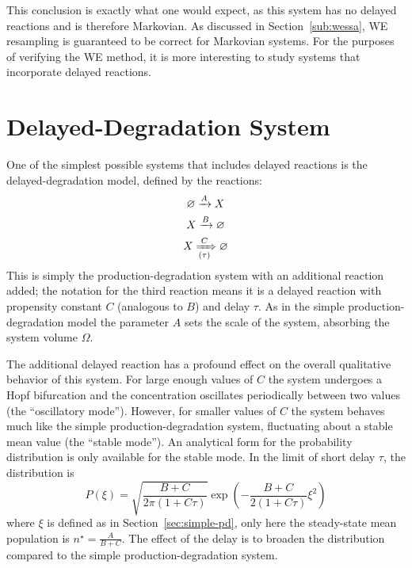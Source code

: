 \documentclass[english,letterpaper,12pt]{report}
\begin{document}
\begin{doublespacing}
This conclusion is exactly what one would expect, as this system has no delayed reactions and is therefore Markovian. As discussed in Section~\ref{sub:wessa}, WE resampling is guaranteed to be correct for Markovian systems. For the purposes of verifying the WE method, it is more interesting to study systems that incorporate delayed reactions.



\section{Delayed-Degradation System} %
\label{sec:delayed-deg}

One of the simplest possible systems that includes delayed reactions is the delayed-degradation model, defined by the reactions:
\begin{align}
    \begin{gathered}
        \varnothing \xrightarrow{A} X \\
        X \xrightarrow {B} \varnothing \\
        X \xRightarrow[(\tau)]{C} \varnothing
    \end{gathered}
    \label{eq:delayed-deg-rxns}
\end{align}
This is simply the production-degradation system with an additional reaction added; the notation for the third reaction means it is a delayed reaction with propensity constant $C$ (analogous to $B$) and delay $\tau$. As in the simple production-degradation model the parameter $A$ sets the scale of the system, absorbing the system volume $\Omega$.

The additional delayed reaction has a profound effect on the overall qualitative behavior of this system. For large enough values of $C$ the system undergoes a Hopf bifurcation and the concentration oscillates periodically between two values (the ``oscillatory mode''). However, for smaller values of $C$ the system behaves much like the simple production-degradation system, fluctuating about a stable mean value (the ``stable mode''). An analytical form for the probability distribution is only available for the stable mode. In the limit of short delay $\tau$, the distribution is \cite{delayed-deg-notes}
\begin{equation}
    P(\xi) = \sqrt{\frac{B + C}{2\pi(1 + C\tau)}}\exp\left( -\frac{B + C}{2(1 + C\tau)} \xi^2 \right)
    \label{eq:dd-analytic-dist}
\end{equation}
where $\xi$ is defined as in Section~\ref{sec:simple-pd}, only here the steady-state mean population is $n^\star = \frac{A}{B + C}$. The effect of the delay is to broaden the distribution compared to the simple production-degradation system.


\end{doublespacing}
\end{document}

